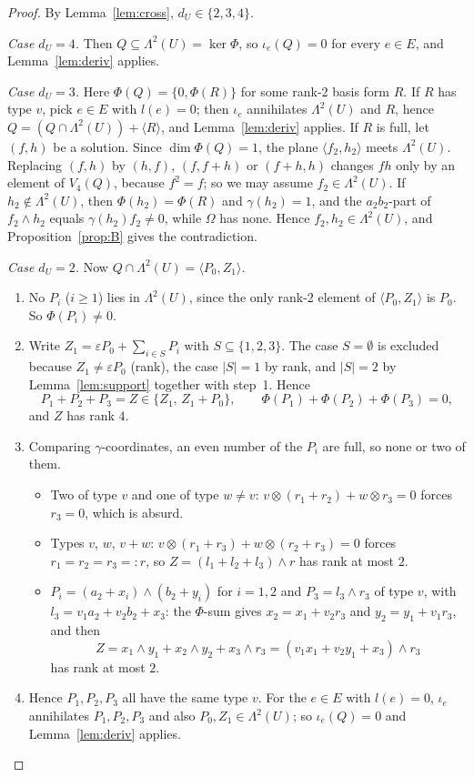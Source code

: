\documentclass[11pt,a4paper]{article}
\theoremstyle{plain}
\theoremstyle{definition}
\theoremstyle{remark}
\newcommand{\Lam}{\Lambda^{2}}
\newcommand{\dU}{d_U}
\newcommand{\Dir}{E}
\begin{document}
\begin{proof}
By Lemma~\ref{lem:cross}, $\dU\in\{2,3,4\}$.

\medskip\noindent\emph{Case $\dU=4$.} Then $Q\subseteq\Lam(U)=\ker\Phi$, so $\iota_e(Q)=0$ for every $e\in\Dir$, and Lemma~\ref{lem:deriv} applies.

\medskip\noindent\emph{Case $\dU=3$.} Here $\Phi(Q)=\{0,\Phi(R)\}$ for some rank-2 basis form $R$.
If $R$ has type $v$, pick $e\in\Dir$ with $l(e)=0$; then $\iota_e$ annihilates $\Lam(U)$ and $R$, hence $Q=(Q\cap\Lam(U))+\langle R\rangle$, and Lemma~\ref{lem:deriv} applies.
If $R$ is full, let $(f,h)$ be a solution. Since $\dim\Phi(Q)=1$, the plane $\langle f_2,h_2\rangle$ meets $\Lam(U)$. Replacing $(f,h)$ by $(h,f)$, $(f,f+h)$ or $(f+h,h)$ changes $fh$ only by an element of $V_4(Q)$, because $f^2=f$; so we may assume $f_2\in\Lam(U)$. If $h_2\notin\Lam(U)$, then $\Phi(h_2)=\Phi(R)$ and $\gamma(h_2)=1$, and the $a_2b_2$-part of $f_2\wedge h_2$ equals $\gamma(h_2)f_2\neq0$, while $\Omega$ has none. Hence $f_2,h_2\in\Lam(U)$, and Proposition~\ref{prop:B} gives the contradiction.

\medskip\noindent\emph{Case $\dU=2$.} Now $Q\cap\Lam(U)=\langle P_0,Z_1\rangle$.
\begin{enumerate}[1.]
  \item No $P_i$ ($i\ge1$) lies in $\Lam(U)$, since the only rank-2 element of $\langle P_0,Z_1\rangle$ is $P_0$. So $\Phi(P_i)\neq0$.
  \item Write $Z_1=\varepsilon P_0+\sum_{i\in S}P_i$ with $S\subseteq\{1,2,3\}$. The case $S=\emptyset$ is excluded because $Z_1\ne\varepsilon P_0$ (rank), the case $|S|=1$ by rank, and $|S|=2$ by Lemma~\ref{lem:support} together with step~1. Hence
  \[
    P_1+P_2+P_3=Z\in\{Z_1,\,Z_1+P_0\},\qquad \Phi(P_1)+\Phi(P_2)+\Phi(P_3)=0,
  \]
  and $Z$ has rank $4$.
  \item Comparing $\gamma$-coordinates, an even number of the $P_i$ are full, so none or two of them.
  \begin{itemize}
    \item Two of type $v$ and one of type $w\neq v$: $v\otimes(r_1+r_2)+w\otimes r_3=0$ forces $r_3=0$, which is absurd.
    \item Types $v$, $w$, $v+w$: $v\otimes(r_1+r_3)+w\otimes(r_2+r_3)=0$ forces $r_1=r_2=r_3=:r$, so $Z=(l_1+l_2+l_3)\wedge r$ has rank at most $2$.
    \item $P_i=(a_2+x_i)\wedge(b_2+y_i)$ for $i=1,2$ and $P_3=l_3\wedge r_3$ of type $v$, with $l_3=v_1a_2+v_2b_2+x_3$: the $\Phi$-sum gives $x_2=x_1+v_2r_3$ and $y_2=y_1+v_1r_3$, and then
    \[
      Z=x_1\wedge y_1+x_2\wedge y_2+x_3\wedge r_3=(v_1x_1+v_2y_1+x_3)\wedge r_3
    \]
    has rank at most $2$.
  \end{itemize}
  \item Hence $P_1,P_2,P_3$ all have the same type $v$. For the $e\in\Dir$ with $l(e)=0$, $\iota_e$ annihilates $P_1,P_2,P_3$ and also $P_0,Z_1\in\Lam(U)$; so $\iota_e(Q)=0$ and Lemma~\ref{lem:deriv} applies.\qedhere
\end{enumerate}
\end{proof}
\end{document}
